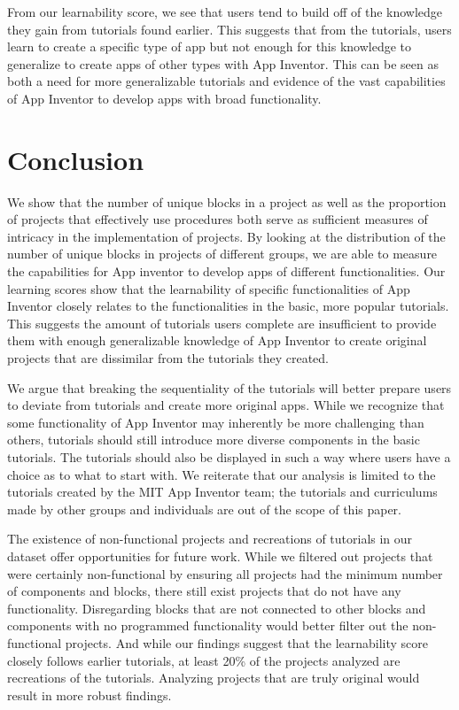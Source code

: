 \documentclass[conference]{IEEEtran}
\begin{document}
From our learnability score, we see that users tend to build off of the knowledge they gain from tutorials found earlier. This suggests that from the tutorials, users learn to create a specific type of app but not enough for this knowledge to generalize to create apps of other types with App Inventor. This can be seen as both a need for more generalizable tutorials and evidence of the vast capabilities of App Inventor to develop apps with broad functionality.




\section{Conclusion}
We show that the number of unique blocks in a project as well as the proportion of projects that effectively use procedures both serve as sufficient measures of intricacy in the implementation of projects. By looking at the distribution of the number of unique blocks in projects of different groups, we are able to measure the capabilities for App inventor to develop apps of different functionalities. Our learning scores show that the learnability of specific functionalities of App Inventor closely relates to the functionalities in the basic, more popular tutorials. This suggests the amount of tutorials users complete are insufficient to provide them with enough generalizable knowledge of App Inventor to create original projects that are dissimilar from the tutorials they created.

We argue that breaking the sequentiality of the tutorials will better prepare users to deviate from tutorials and create more original apps. While we recognize that some functionality of App Inventor may inherently be more challenging than others, tutorials should still introduce more diverse components in the basic tutorials. The tutorials should also be displayed in such a way where users have a choice as to what to start with. We reiterate that our analysis is limited to the tutorials created by the MIT App Inventor team; the tutorials and curriculums made by other groups and individuals are out of the scope of this paper.

The existence of non-functional projects and recreations of tutorials in our dataset offer opportunities for future work. While we filtered out projects that were certainly non-functional by ensuring all projects had the minimum number of components and blocks, there still exist projects that do not have any functionality. Disregarding blocks that are not connected to other blocks and components with no programmed functionality would better filter out the non-functional projects. And while our findings suggest that the learnability score closely follows earlier tutorials, at least 20\% of the projects analyzed are recreations of the tutorials. Analyzing projects that are truly original would result in more robust findings.
\end{document}
